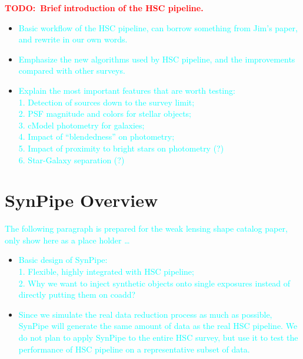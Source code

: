 \documentclass[preprint]{aastex}
\newcommand{\todo}[1]{\textcolor{red}{\textbf{TODO:~#1}}}
\newcommand{\plan}[1]{\textcolor{cyan}{#1}}
\begin{document}
    \todo{Brief introduction of the HSC pipeline.}
    \begin{itemize}
        \item \plan{Basic workflow of the HSC pipeline, 
                    can borrow something from Jim's paper, and rewrite in our own words.}
        \item \plan{Emphasize the new algorithms used by HSC pipeline, and the 
                    improvements compared with other surveys.}
        \item \plan{Explain the most important features that are worth testing: \\
                    1. Detection of sources down to the survey limit; \\
                    2. PSF magnitude and colors for stellar objects; \\
                    3. cModel photometry for galaxies; \\
                    4. Impact of ``blendedness'' on photometry; \\
                    5. Impact of proximity to bright stars on photometry (?) \\
                    6. Star-Galaxy separation (?)}   
    \end{itemize}


\section{SynPipe Overview}

    \plan{The following paragraph is prepared for the weak lensing shape catalog paper, 
          only show here as a place holder \ldots}
          
    \begin{itemize}
        \item \plan{Basic design of SynPipe: \\
                    1. Flexible, highly integrated with HSC pipeline; \\
                    2. Why we want to inject synthetic objects onto single 
                       exposures instead of directly putting them on coadd?}
        \item \plan{Since we simulate the real data reduction process as much 
                    as possible, SynPipe will generate the same amount of data
                    as the real HSC pipeline.  We do not plan to apply SynPipe
                    to the entire HSC survey, but use it to test the performance 
                    of HSC pipeline on a representative subset of data.}         
    \end{itemize}
    
\end{document}
